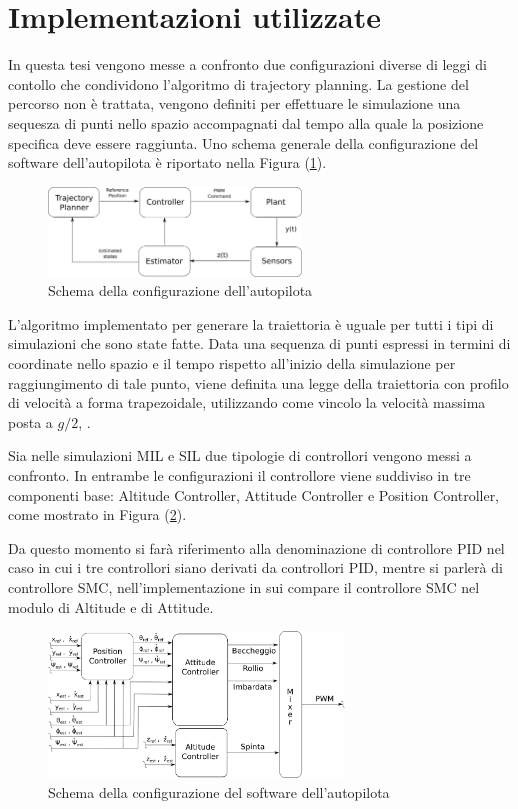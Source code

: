 \section{Implementazioni utilizzate}
\label{cap:controllore}
In questa tesi vengono messe a confronto due configurazioni diverse di leggi di contollo che condividono l'algoritmo di trajectory planning. La gestione del percorso non è trattata, vengono definiti per effettuare le simulazione una sequesza di punti nello spazio accompagnati dal tempo alla quale la posizione specifica deve essere raggiunta.
Uno schema generale della configurazione del software dell'autopilota è riportato nella Figura (\ref{fig:Autopilota}).


\begin{figure}
	\centering
	\includegraphics[width=0.6\textwidth]{SistemaQuadrirotore/Figure/Autopilota}
	\caption{Schema della configurazione dell'autopilota}
	\label{fig:Autopilota}
\end{figure}

L'algoritmo implementato per generare la traiettoria è uguale per tutti i tipi di simulazioni che sono state fatte. Data una sequenza di punti espressi in termini di coordinate nello spazio e il tempo rispetto all'inizio della simulazione per raggiungimento di tale punto, viene definita una legge della traiettoria con profilo di velocità a forma trapezoidale, utilizzando come vincolo la velocità massima posta a $g/2$, \cite{DesTestCarm}.

Sia nelle simulazioni MIL e SIL due tipologie di controllori vengono messi a confronto. In entrambe le configurazioni il controllore viene suddiviso in tre componenti base: Altitude Controller, Attitude Controller e Position Controller, come mostrato in Figura (\ref{fig:Controller}).

Da questo momento si farà riferimento alla denominazione di controllore PID nel caso in cui i tre controllori siano derivati da controllori PID, mentre si parlerà di controllore SMC, nell'implementazione in sui compare il controllore SMC nel modulo di Altitude e di Attitude.

\begin{figure}
	\centering
	\includegraphics[width=0.7\textwidth]{SistemaQuadrirotore/Figure/Controllore}
	\caption{Schema della configurazione del software dell'autopilota}
	\label{fig:Controller}
\end{figure}


